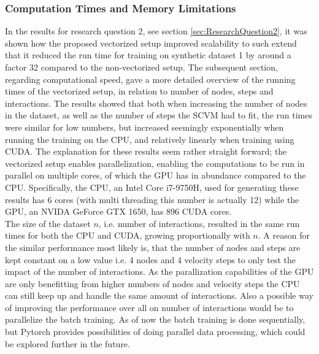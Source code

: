 \subsubsection{Computation Times and Memory Limitations}
\label{sec:Discussion:Results:ComputationSpeed}
In the results for research question 2, see section \ref{sec:ResearchQuestion2}, it was shown how the proposed vectorized setup improved scalability to such extend that it reduced the run time for training on synthetic dataset 1 by around a factor 32 compared to the non-vectorized setup.
The subsequent section, regarding computational speed, gave a more detailed overview of the running times of the vectorized setup, in relation to number of nodes, steps and interactions.
The results showed that both when increasing the number of nodes in the dataset, as well as the number of steps the SCVM had to fit, the run times were similar for low numbers, but increased seemingly exponentially when running the training on the CPU, and relatively linearly when training using CUDA.
The explanation for these results seem rather straight forward; the vectorized setup enables parallelization, enabling the computations to be run in parallel on multiple cores, of which the GPU has in abundance compared to the CPU. 
Specifically, the CPU, an Intel Core i7-9750H, used for generating these results has 6 cores (with multi threading this number is actually 12) while the GPU, an NVIDA GeForce GTX 1650, has 896 CUDA cores.
\\
\noindent
The size of the dataset $n$, i.e. number of interactions, resulted in the same run times for both the CPU and CUDA, growing proportionally with $n$.
A reason for the similar performance most likely is, that the number of nodes and steps are kept constant on a low value i.e. 4 nodes and 4 velocity steps to only test the impact of the number of interactions. As the parallization capabilities of the GPU are only benefitting from higher numbers of nodes and velocity steps the CPU can still keep up and handle the same amount of interactions. Also a possible way of improving the performance over all on number of interactions would be to parallelize the batch training. As of now the batch training is done sequentially, but Pytorch provides possibilities of doing parallel data processing, which could be explored further in the future. 


